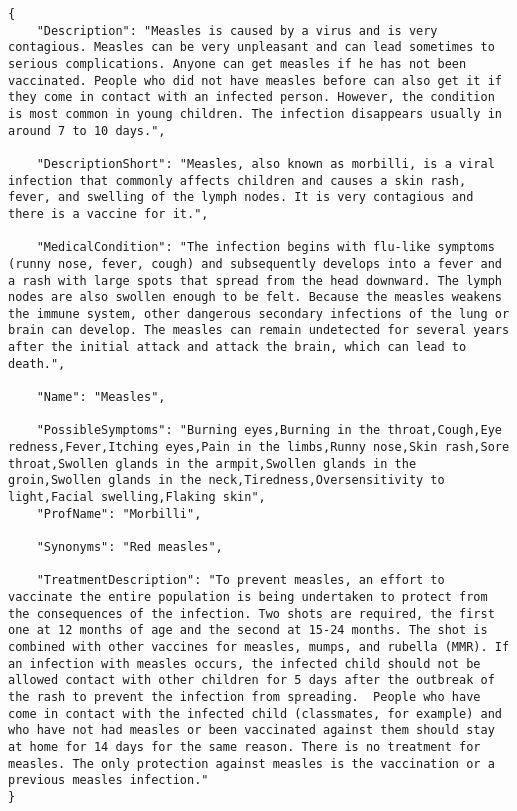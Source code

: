 \begin{lstlisting}[caption={Response ApiMedic API (issue ID 105)}]
{
	"Description": "Measles is caused by a virus and is very contagious. Measles can be very unpleasant and can lead sometimes to serious complications. Anyone can get measles if he has not been vaccinated. People who did not have measles before can also get it if they come in contact with an infected person. However, the condition is most common in young children. The infection disappears usually in around 7 to 10 days.",
	
	"DescriptionShort": "Measles, also known as morbilli, is a viral infection that commonly affects children and causes a skin rash, fever, and swelling of the lymph nodes. It is very contagious and there is a vaccine for it.",
	
	"MedicalCondition": "The infection begins with flu-like symptoms (runny nose, fever, cough) and subsequently develops into a fever and a rash with large spots that spread from the head downward. The lymph nodes are also swollen enough to be felt. Because the measles weakens the immune system, other dangerous secondary infections of the lung or brain can develop. The measles can remain undetected for several years after the initial attack and attack the brain, which can lead to death.",
	
	"Name": "Measles",
	
	"PossibleSymptoms": "Burning eyes,Burning in the throat,Cough,Eye redness,Fever,Itching eyes,Pain in the limbs,Runny nose,Skin rash,Sore throat,Swollen glands in the armpit,Swollen glands in the groin,Swollen glands in the neck,Tiredness,Oversensitivity to light,Facial swelling,Flaking skin",
	"ProfName": "Morbilli",
	
	"Synonyms": "Red measles",
	
	"TreatmentDescription": "To prevent measles, an effort to vaccinate the entire population is being undertaken to protect from the consequences of the infection. Two shots are required, the first one at 12 months of age and the second at 15-24 months. The shot is combined with other vaccines for measles, mumps, and rubella (MMR). If an infection with measles occurs, the infected child should not be allowed contact with other children for 5 days after the outbreak of the rash to prevent the infection from spreading.  People who have come in contact with the infected child (classmates, for example) and who have not had measles or been vaccinated against them should stay at home for 14 days for the same reason. There is no treatment for measles. The only protection against measles is the vaccination or a previous measles infection."	
}
\end{lstlisting}



